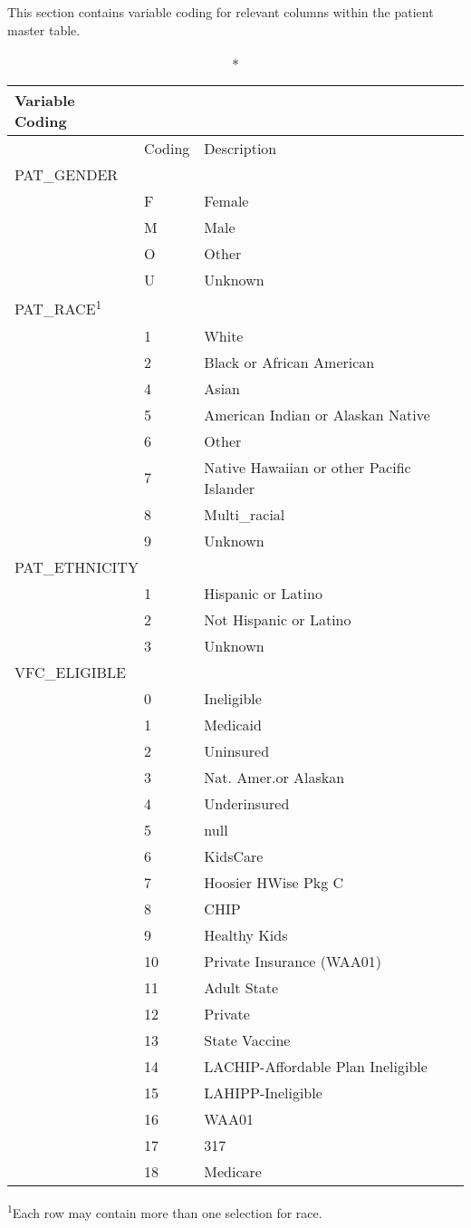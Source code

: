 \documentclass[
  letterpaper,
  DIV=11,
  numbers=noendperiod]{scrreprt}
\begin{document}
This section contains variable coding for relevant columns within the
patient master table.

\setlength{\LTpost}{0mm}
\begin{longtable}{l|ll}
\caption*{
{\large Variable Coding}
} \\ 
\toprule
\multicolumn{1}{l}{} & Coding & Description \\ 
\midrule
\multicolumn{3}{l}{PAT\_GENDER} \\ 
\midrule
  & F & Female \\ 
  & M & Male \\ 
  & O & Other \\ 
  & U & Unknown \\ 
\midrule
\multicolumn{3}{l}{PAT\_RACE\textsuperscript{1}} \\ 
\midrule
  & 1 & White \\ 
  & 2 & Black or African American \\ 
  & 4 & Asian \\ 
  & 5 & American Indian or Alaskan Native \\ 
  & 6 & Other \\ 
  & 7 & Native Hawaiian or other Pacific Islander \\ 
  & 8 & Multi\_racial \\ 
  & 9 & Unknown \\ 
\midrule
\multicolumn{3}{l}{PAT\_ETHNICITY} \\ 
\midrule
  & 1 & Hispanic or Latino \\ 
  & 2 & Not Hispanic or Latino \\ 
  & 3 & Unknown \\ 
\midrule
\multicolumn{3}{l}{VFC\_ELIGIBLE} \\ 
\midrule
  & 0 & Ineligible \\ 
  & 1 & Medicaid \\ 
  & 2 & Uninsured \\ 
  & 3 & Nat. Amer.or Alaskan \\ 
  & 4 & Underinsured \\ 
  & 5 & null \\ 
  & 6 & KidsCare \\ 
  & 7 & Hoosier HWise Pkg C \\ 
  & 8 & CHIP \\ 
  & 9 & Healthy Kids \\ 
  & 10 & Private Insurance (WAA01) \\ 
  & 11 & Adult State \\ 
  & 12 & Private \\ 
  & 13 & State Vaccine \\ 
  & 14 & LACHIP-Affordable Plan Ineligible \\ 
  & 15 & LAHIPP-Ineligible \\ 
  & 16 & WAA01 \\ 
  & 17 & 317 \\ 
  & 18 & Medicare \\ 
\bottomrule
\end{longtable}
\begin{minipage}{\linewidth}
\textsuperscript{1}Each row may contain more than one selection for race.\\
\end{minipage}
\end{document}
